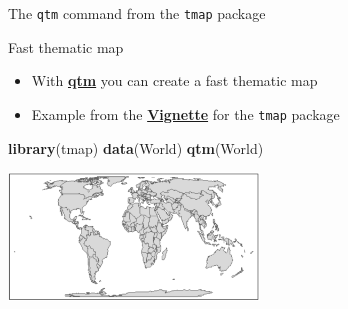 \documentclass[
  ignorenonframetext,
]{beamer}
\newenvironment{Shaded}{\begin{snugshade}}{\end{snugshade}}
\newcommand{\KeywordTok}[1]{\textcolor[rgb]{0.13,0.29,0.53}{\textbf{#1}}}
\newcommand{\NormalTok}[1]{#1}
\begin{document}
\begin{frame}[fragile]{The \texttt{qtm} command from the \texttt{tmap}
package}
\protect\hypertarget{the-qtm-command-from-the-tmap-package}{}
\begin{block}{Fast thematic map}
\protect\hypertarget{fast-thematic-map}{}
\begin{itemize}
\item
  With
  \href{https://cran.r-project.org/web/packages/tmap/vignettes/tmap-nutshell.html}{\textbf{qtm}}
  you can create a fast thematic map
\item
  Example from the
  \href{https://cran.r-project.org/web/packages/tmap/vignettes/tmap-nutshell.html}{\textbf{Vignette}}
  for the \texttt{tmap} package
\end{itemize}

\begin{Shaded}
\begin{Highlighting}[]
\KeywordTok{library}\NormalTok{(tmap)}
\KeywordTok{data}\NormalTok{(World)}
\KeywordTok{qtm}\NormalTok{(World)}
\end{Highlighting}
\end{Shaded}

\includegraphics[width=0.5\textwidth,height=\textheight]{pics/qtm_world2.PNG}
\end{block}
\end{frame}
\end{document}
